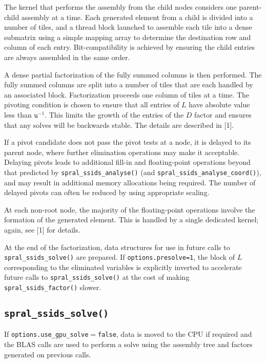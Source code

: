 The kernel that performs the assembly from the child nodes considers one parent-child
assembly at a time. Each  generated element from a child is divided into a number of
tiles, and a thread block launched to assemble each tile into a 
dense submatrix using a simple
mapping array to determine the destination row and column of each entry.
Bit-compatibility is achieved by ensuring the child entries are
always assembled in the same order. 

A dense partial factorization of the fully summed columns is then performed. The
fully summed columns are split into a number
of tiles that are each handled by an associated  block. Factorization
proceeds one column of tiles at a time. The pivoting condition is chosen to
ensure that all entries of $L$ have absolute value less than $\texttt{u}^{-1}$.
This limits the growth of the entries of the $D$ factor and ensures that any
solves will be backwards stable. The details are described in [1].

If a pivot candidate does not pass the pivot tests at a node, it is delayed
to its parent node, where further elimination operations may make it acceptable.
Delaying pivots leads to additional fill-in and floating-point
operations beyond that predicted by {\tt spral\_ssids\_analyse()}  (and {\tt spral\_ssids\_analyse\_coord()}), 
and may result in additional memory allocations being required.
The number of delayed pivots can often be reduced by using appropriate scaling.

At each non-root node, the majority of the floating-point operations  involve the formation
of the generated element. 
This is handled by a single dedicated kernel; again, see [1] for details.

At the end of the factorization, data structures for use in future calls to
\texttt{spral\_ssids\_solve()} are prepared. If \texttt{options.presolve=1}, the
block of $L$ corresponding to the eliminated variables is explicitly inverted
to accelerate future calls to \texttt{spral\_ssids\_solve()} at the cost of making
\texttt{spral\_ssids\_factor()} slower.

\subsection*{\texttt{spral\_ssids\_solve()}}
If \texttt{options.use\_gpu\_solve}$=$\texttt{false}, data is moved to the
CPU if required and the BLAS calls are used to perform a solve using the
assembly tree and factors generated on previous calls.

